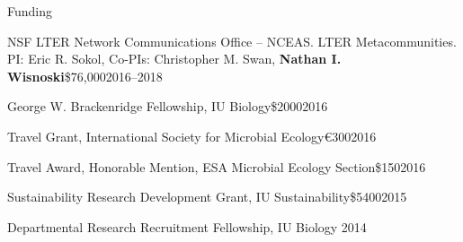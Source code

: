 \documentclass{resume} %
\begin{document}
\begin{rSection}{Funding}

\begin{Grant}{NSF LTER Network Communications Office -- NCEAS. LTER Metacommunities. PI: Eric R. Sokol, Co-PIs: Christopher M. Swan, {\bf Nathan I. Wisnoski}}{\$76,000}{2016--2018}
\end{Grant}

\begin{Grant}{George W. Brackenridge Fellowship, IU Biology}{\$2000}{2016}
\end{Grant}

\begin{Grant}{Travel Grant, International Society for Microbial Ecology}{\euro{}300}{2016}
\end{Grant}

\begin{Grant}{Travel Award, Honorable Mention, ESA Microbial Ecology Section}{\$150}{2016}
\end{Grant}

\begin{Grant}{Sustainability Research Development Grant, IU Sustainability}{\$5400}{2015}
\end{Grant}

\begin{Grant}{Departmental Research Recruitment Fellowship, IU Biology}{ }{2014}
\end{Grant}

\end{rSection}


\end{document}

